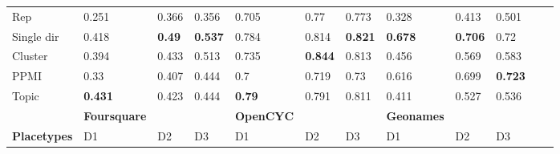 {\begin{landscape}
\begin{table}[]
\begin{tabular}{llll@{\hskip 0.25in}lll@{\hskip 0.25in}lllll}
			\toprule[\heavyrulewidth]
			Rep               & 0.251                           & 0.366                           & 0.356                           & 0.705                           & 0.77                            & 0.773                           & 0.328                           & 0.413                           & 0.501                           &             &             \\
			Single dir        & 0.418                           & \textbf{0.49}  & \textbf{0.537} & 0.784                           & 0.814                           & \textbf{0.821} & \textbf{0.678} & \textbf{0.706} & 0.72                            &             &             \\
			Cluster           & 0.394                           & 0.433                           & 0.513                           & 0.735                           & \textbf{0.844} & 0.813                           & 0.456                           & 0.569                           & 0.583                           &             &             \\
			PPMI              & 0.33                            & 0.407                           & 0.444                           & 0.7                             & 0.719                           & 0.73                            & 0.616                           & 0.699                           & \textbf{0.723} &             &             \\
			Topic             & \textbf{0.431} & 0.423                           & 0.444                           & \textbf{0.79}  & 0.791                           & 0.811                           & 0.411                           & 0.527                           & 0.536                           &             &             \\
			& \textbf{Foursquare}                      &                                 &                                 & \textbf{OpenCYC}                         &                                 &                                 & \textbf{Geonames}                        &                                 &                                 &             &             \\
			\textbf{Placetypes}        & D1                              & D2                              & D3                              & D1                              & D2                              & D3                              & D1                              & D2                              & D3                              &             &             \\

\end{tabular}
\end{table}
\end{landscape}}
